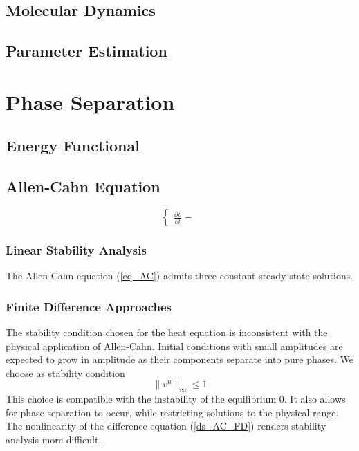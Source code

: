 \documentclass[12pt, reqno]{article}
\theoremstyle{definition}
\theoremstyle{remark}
\begin{document}
\subsection{Molecular Dynamics} \label{ssec_diff_MD}


\subsection{Parameter Estimation} \label{ssec_diff_estim}


\section{Phase Separation} \label{sec_phase}

\subsection{Energy Functional} \label{sec_func}

\subsection{Allen-Cahn Equation} \label{ssec_AC}

\begin{equation} \label{eq_AC}
    \left\{
        \begin{split}
            \frac{\partial v}{\partial t}=
        \end{split}
    \right.
\end{equation}

\subsubsection{Linear Stability Analysis} \label{sssec_linear_AC}

The Allen-Cahn equation (\ref{eq_AC}) admits three constant steady state solutions.

\subsubsection{Finite Difference Approaches} \label{sssec_AC_FD}









The stability condition chosen for the heat equation is inconsistent with the physical application of Allen-Cahn. 
Initial conditions with small amplitudes are expected to grow in amplitude as their components separate into pure phases. 
We choose as stability condition
\begin{equation} \label{eq_AC_stability}
	\|v^n\|_\infty\le1
\end{equation}
This choice is compatible with the instability of the equilibrium 0. It also allows for phase separation to occur, while restricting solutions to the physical range.
The nonlinearity of the difference equation (\ref{ds_AC_FD}) renders stability analysis more difficult.
\end{document}
